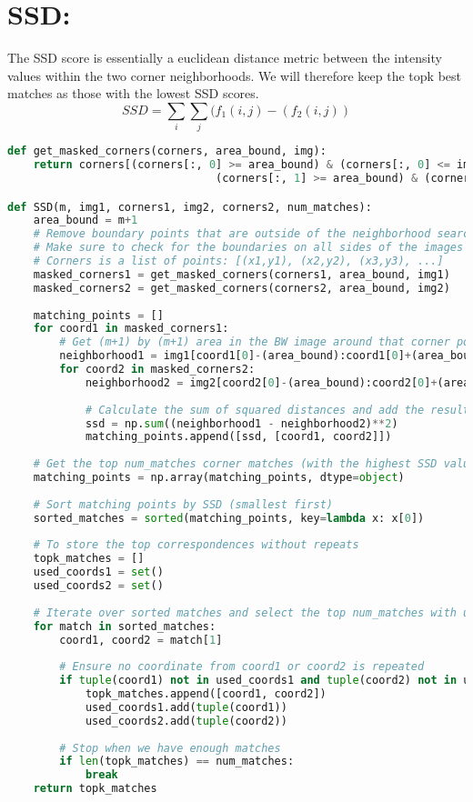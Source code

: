 \documentclass{article}
\begin{document}
\section{SSD:}
The SSD score is essentially a euclidean distance metric between the intensity values within the two corner neighborhoods. We will therefore keep the topk best matches as those with the lowest SSD scores.
\[SSD = \sum_i \sum_j (f_1 (i, j) - (f_2 (i, j))\]
\begin{lstlisting}[language=Python]
def get_masked_corners(corners, area_bound, img):
    return corners[(corners[:, 0] >= area_bound) & (corners[:, 0] <= img.shape[0] - area_bound) &
                                (corners[:, 1] >= area_bound) & (corners[:, 1] <= img.shape[1] - area_bound)]

def SSD(m, img1, corners1, img2, corners2, num_matches):
    area_bound = m+1
    # Remove boundary points that are outside of the neighborhood search area
    # Make sure to check for the boundaries on all sides of the images
    # Corners is a list of points: [(x1,y1), (x2,y2), (x3,y3), ...]
    masked_corners1 = get_masked_corners(corners1, area_bound, img1)
    masked_corners2 = get_masked_corners(corners2, area_bound, img2)
    
    matching_points = []
    for coord1 in masked_corners1:
        # Get (m+1) by (m+1) area in the BW image around that corner point
        neighborhood1 = img1[coord1[0]-(area_bound):coord1[0]+(area_bound), coord1[1]-(area_bound):coord1[1]+(area_bound)]
        for coord2 in masked_corners2:
            neighborhood2 = img2[coord2[0]-(area_bound):coord2[0]+(area_bound), coord2[1]-(area_bound):coord2[1]+(area_bound)]
            
            # Calculate the sum of squared distances and add the result to a list to later get the topk
            ssd = np.sum((neighborhood1 - neighborhood2)**2)
            matching_points.append([ssd, [coord1, coord2]])
            
    # Get the top num_matches corner matches (with the highest SSD values first)# Convert to array for easier manipulation
    matching_points = np.array(matching_points, dtype=object)
    
    # Sort matching points by SSD (smallest first)
    sorted_matches = sorted(matching_points, key=lambda x: x[0])
    
    # To store the top correspondences without repeats
    topk_matches = []
    used_coords1 = set()
    used_coords2 = set()
    
    # Iterate over sorted matches and select the top num_matches with unique points
    for match in sorted_matches:
        coord1, coord2 = match[1]
        
        # Ensure no coordinate from coord1 or coord2 is repeated
        if tuple(coord1) not in used_coords1 and tuple(coord2) not in used_coords2:
            topk_matches.append([coord1, coord2])
            used_coords1.add(tuple(coord1))
            used_coords2.add(tuple(coord2))
        
        # Stop when we have enough matches
        if len(topk_matches) == num_matches:
            break
    return topk_matches
\end{lstlisting}
\end{document}
